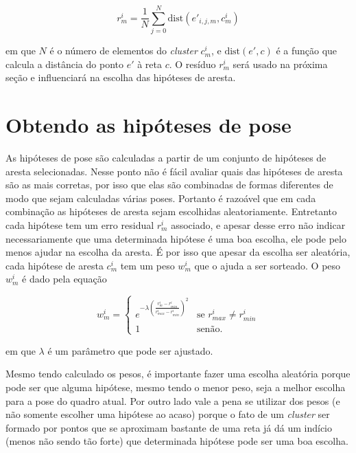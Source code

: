 \begin{equation}
r^i_m = \frac{1}{N} \sum^{N}_{j = 0} \text{dist} (e'_{i,j,m}, c^i_m)
\end{equation}

em que $N$ é o número de elementos do \emph{cluster} $c^i_m$, e $\text{dist} (e', c)$ é a função que calcula a distância do ponto $e'$ à reta $c$. O resíduo $r^i_m$ será usado na próxima seção e influenciará na escolha das hipóteses de aresta.

\section{Obtendo as hipóteses de pose}

As hipóteses de pose são calculadas a partir de um conjunto de hipóteses de aresta selecionadas. Nesse ponto não é fácil avaliar quais das hipóteses de aresta são as mais corretas, por isso que elas são combinadas de formas diferentes de modo que sejam calculadas várias poses. Portanto é razoável que em cada combinação as hipóteses de aresta sejam escolhidas aleatoriamente. Entretanto cada hipótese tem um erro residual $r^i_m$ associado, e apesar desse erro não indicar necessariamente que uma determinada hipótese é uma boa escolha, ele pode pelo menos ajudar na escolha da aresta. É por isso que apesar da escolha ser aleatória, cada hipótese de aresta $c^i_m$ tem um peso $w^i_m$ que o ajuda a ser sorteado. O peso $w^i_m$ é dado pela equação \cite{celine}

\begin{equation}
w^i_m = \begin{cases}
    e^{-\lambda \left( \frac{r^i_m - r^i_{min}}{r^i_{max} - r^i_{min}}\right)^2 } & \mbox{se } r^i_{max} \neq r^i_{min} \\
    1 & \mbox{senão}.
\end{cases}
\end{equation}

em que $\lambda$ é um parâmetro que pode ser ajustado.

Mesmo tendo calculado os pesos, é importante fazer uma escolha aleatória porque pode ser que alguma hipótese, mesmo tendo o menor peso, seja a melhor escolha para a pose do quadro atual. Por outro lado vale a pena se utilizar dos pesos (e não somente escolher uma hipótese ao acaso) porque o fato de um \emph{cluster} ser formado por pontos que se aproximam bastante de uma reta já dá um indício (menos não sendo tão forte) que determinada hipótese pode ser uma boa escolha.

